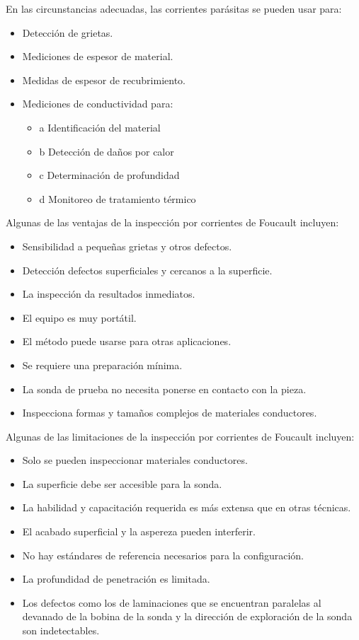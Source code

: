 En las circunstancias adecuadas, las corrientes parásitas se pueden usar para:

\begin{itemize}
	\item Detección de grietas.
	\item Mediciones de espesor de material.
	\item Medidas de espesor de recubrimiento.
	\item Mediciones de conductividad para:
	\begin{itemize}
		\item{a} Identificación del material
		\item{b} Detección de daños por calor
		\item{c} Determinación de profundidad
		\item{d} Monitoreo de tratamiento térmico
	\end{itemize}	
\end{itemize}

Algunas de las ventajas de la inspección por corrientes de Foucault incluyen:

\begin{itemize}
	\item Sensibilidad a pequeñas grietas y otros defectos.
	\item Detección defectos superficiales y cercanos a la superficie.
	\item La inspección da resultados inmediatos.
	\item El equipo es muy portátil.
	\item El método puede usarse para otras aplicaciones.
	\item Se requiere una preparación mínima.
	\item La sonda de prueba no necesita ponerse en contacto con la pieza.
	\item Inspecciona formas y tamaños complejos de materiales conductores.
\end{itemize}

Algunas de las limitaciones de la inspección por corrientes de Foucault incluyen:

\begin{itemize}
	\item Solo se pueden inspeccionar materiales conductores.
	\item La superficie debe ser accesible para la sonda.
	\item La habilidad y capacitación requerida es más extensa que en otras técnicas.
	\item El acabado superficial y la aspereza pueden interferir.
	\item No hay estándares de referencia necesarios para la configuración.
	\item La profundidad de penetración es limitada.
	\item Los defectos como los de laminaciones que se encuentran paralelas al devanado de la bobina de la sonda y la dirección de exploración de la sonda son indetectables.
\end{itemize}

